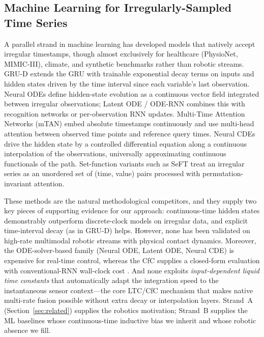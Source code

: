 \documentclass[conference]{IEEEtran}
\begin{document}
\subsection{Machine Learning for Irregularly-Sampled Time Series}
A parallel strand in machine learning has developed models that natively accept irregular timestamps, though almost exclusively for healthcare (PhysioNet, MIMIC-III), climate, and synthetic benchmarks rather than robotic streams. GRU-D \cite{che2018grud} extends the GRU with trainable exponential decay terms on inputs and hidden states driven by the time interval since each variable's last observation. Neural ODEs \cite{chen2018node} define hidden-state evolution as a continuous vector field integrated between irregular observations; Latent ODE / ODE-RNN \cite{rubanova2019latent} combines this with recognition networks or per-observation RNN updates. Multi-Time Attention Networks (mTAN) \cite{shukla2021mtan} embed absolute timestamps continuously and use multi-head attention between observed time points and reference query times. Neural CDEs \cite{kidger2020ncde} drive the hidden state by a controlled differential equation along a continuous interpolation of the observations, universally approximating continuous functionals of the path. Set-function variants such as SeFT \cite{horn2020seft} treat an irregular series as an unordered set of (time, value) pairs processed with permutation-invariant attention.

These methods are the natural methodological competitors, and they supply two key pieces of supporting evidence for our approach: continuous-time hidden states demonstrably outperform discrete-clock models on irregular data, and explicit time-interval decay (as in GRU-D) helps. However, none has been validated on high-rate multimodal robotic streams with physical contact dynamics. Moreover, the ODE-solver-based family (Neural ODE, Latent ODE, Neural CDE) is expensive for real-time control, whereas the CfC supplies a closed-form evaluation with conventional-RNN wall-clock cost \cite{hasani2022cfc}. And none exploits \emph{input-dependent liquid time constants} that automatically adapt the integration speed to the instantaneous sensor context---the core LTC/CfC mechanism that makes native multi-rate fusion possible without extra decay or interpolation layers. Strand~A (Section~\ref{sec:related}) supplies the robotics motivation; Strand~B supplies the ML baselines whose continuous-time inductive bias we inherit and whose robotic absence we fill.
\end{document}

